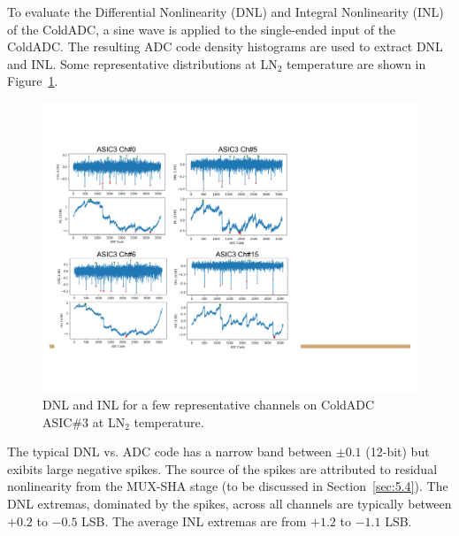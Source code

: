 \label{sec:4.2}


To evaluate the Differential Nonlinearity (DNL) and Integral Nonlinearity (INL) of the ColdADC, a sine wave is applied to the single-ended input of the ColdADC. The resulting ADC code density histograms are used to extract DNL and INL. Some representative distributions at LN$_2$ temperature are shown in Figure~\ref{fig:adc_inldnl}.

\begin{figure}[htb]
\centering
\begin{center}
\includegraphics[width=1.0\textwidth]{figures/ColdADC_StaticLinearity.pdf}
\end{center}
\caption{DNL and INL for a few representative channels on ColdADC ASIC\#3 at LN$_2$ temperature.}
\label{fig:adc_inldnl}
\end{figure}

The typical DNL vs. ADC code has a narrow band between $\pm 0.1$ (12-bit) but exibits large negative spikes. The source of the spikes are attributed to residual nonlinearity from the MUX-SHA stage (to be discussed in Section~\ref{sec:5.4}). The DNL extremas, dominated by the spikes, across all channels are typically between $+0.2$ to $-0.5$ LSB. The average INL extremas are from $+1.2$ to $-1.1$ LSB.


